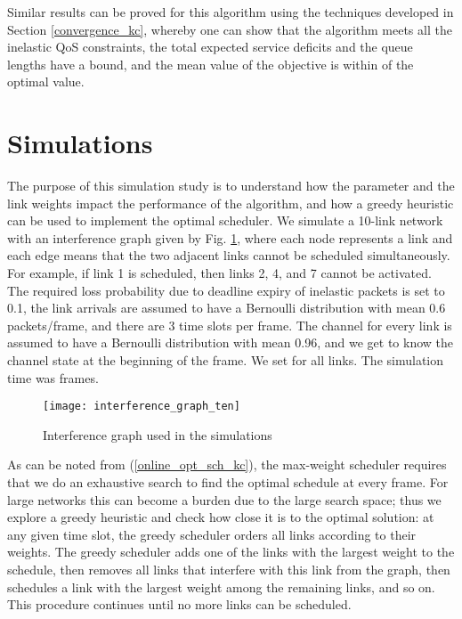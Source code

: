 \documentclass[conference]{IEEEtran}
\begin{document}
Similar results can be proved for this algorithm using the techniques developed in Section \ref{convergence_kc}, whereby one can show that the algorithm meets all the inelastic QoS constraints, the total expected service deficits and the queue lengths have a  bound, and the mean value of the objective is within  of the optimal value.





\section{Simulations}

The purpose of this simulation study is to understand how the parameter  and the link weights  impact the performance of the algorithm,  and how a greedy heuristic can be used to implement the optimal scheduler. We simulate a 10-link network with an interference graph given by Fig. \ref{interference_graph}, where each node represents a link and each edge means that the two adjacent links cannot be scheduled simultaneously. For example, if link 1 is scheduled, then links 2, 4, and 7 cannot be activated. The required loss probability due to deadline expiry of inelastic packets is set to 0.1, the link arrivals are assumed to have a Bernoulli distribution with mean 0.6 packets/frame, and there are 3 time slots per frame. The channel for every link is assumed to have a Bernoulli distribution with mean 0.96, and we get to know the channel state at the beginning of the frame. We set  for all links. The simulation time was  frames.

\begin{figure}[t]
	\centering
	\texttt{[image: interference\_graph\_ten]}
	\caption{Interference graph used in the simulations}
	\label{interference_graph}
\end{figure}

As can be noted from (\ref{online_opt_sch_kc}), the max-weight scheduler requires that we do an exhaustive search to find the optimal schedule at every frame. For large networks this can become a burden due to the large search space; thus we explore a greedy heuristic and check how close it is to the optimal solution: at any given time slot, the greedy scheduler orders all links according to their weights. The greedy scheduler adds one of the links with the largest weight to the schedule, then removes all links that interfere with this link from the graph, then schedules a link with the largest weight among the remaining links, and so on. This procedure continues until no more links can be scheduled.
\end{document}
